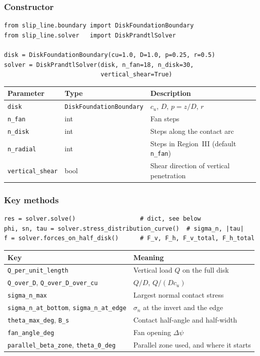 \documentclass[11pt,a4paper]{article}
\begin{document}
\subsubsection*{Constructor}

\begin{lstlisting}
from slip_line.boundary import DiskFoundationBoundary
from slip_line.solver   import DiskPrandtlSolver

disk = DiskFoundationBoundary(cu=1.0, D=1.0, p=0.25, r=0.5)
solver = DiskPrandtlSolver(disk, n_fan=18, n_disk=30,
                           vertical_shear=True)
\end{lstlisting}

\begin{center}
\begin{tabular}{lll}
\toprule
Parameter & Type & Description \\
\midrule
\texttt{disk} & \texttt{DiskFoundationBoundary} & $c_u$, $D$, $p = z/D$, $r$ \\
\texttt{n\_fan}  & int & Fan steps \\
\texttt{n\_disk} & int & Steps along the contact arc \\
\texttt{n\_radial} & int & Steps in Region~III (default \texttt{n\_fan}) \\
\texttt{vertical\_shear} & bool & Shear direction of vertical penetration \\
\bottomrule
\end{tabular}
\end{center}

\subsubsection*{Key methods}

\begin{lstlisting}
res = solver.solve()                  # dict, see below
phi, sn, tau = solver.stress_distribution_curve()  # sigma_n, |tau|
f = solver.forces_on_half_disk()      # F_v, F_h, F_v_total, F_h_total
\end{lstlisting}

\begin{center}
\begin{tabular}{ll}
\toprule
Key & Meaning \\
\midrule
\texttt{Q\_per\_unit\_length} & Vertical load $Q$ on the full disk \\
\texttt{Q\_over\_D}, \texttt{Q\_over\_D\_over\_cu} & $Q/D$, $Q/(Dc_u)$ \\
\texttt{sigma\_n\_max} & Largest normal contact stress \\
\texttt{sigma\_n\_at\_bottom}, \texttt{sigma\_n\_at\_edge} & $\sigma_n$ at the invert and the edge \\
\texttt{theta\_max\_deg}, \texttt{B\_s} & Contact half-angle and half-width \\
\texttt{fan\_angle\_deg} & Fan opening $\Delta\psi$ \\
\texttt{parallel\_beta\_zone}, \texttt{theta\_0\_deg} & Parallel zone used, and where it starts \\
\bottomrule
\end{tabular}
\end{center}
\end{document}
